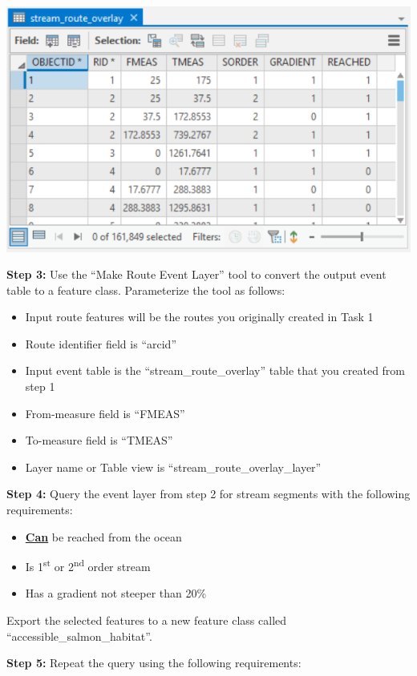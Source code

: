\documentclass[
]{book}
\begin{document}
\includegraphics[width=1\linewidth]{images/02-stream-route-overlay}

\textbf{Step 3:} Use the ``Make Route Event Layer'' tool to convert the output event table to a feature class. Parameterize the tool as follows:

\begin{itemize}
\item
  Input route features will be the routes you originally created in Task 1
\item
  Route identifier field is ``arcid''
\item
  Input event table is the ``stream\_route\_overlay'' table that you created from step 1
\item
  From-measure field is ``FMEAS''
\item
  To-measure field is ``TMEAS''
\item
  Layer name or Table view is ``stream\_route\_overlay\_layer''
\end{itemize}

\textbf{Step 4:} Query the event layer from step 2 for stream segments with the following requirements:

\begin{itemize}
\item
  \ul{\textbf{Can}} be reached from the ocean
\item
  Is 1\textsuperscript{st} or 2\textsuperscript{nd} order stream
\item
  Has a gradient not steeper than 20\%
\end{itemize}

Export the selected features to a new feature class called ``accessible\_salmon\_habitat''.

\textbf{Step 5:} Repeat the query using the following requirements:
\end{document}
